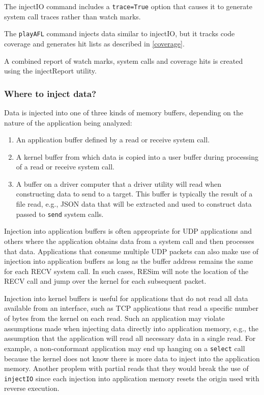\documentclass[titlepage]{article}
\begin{document}
The injectIO command includes a {\tt trace=True} option that causes it to generate system call traces rather than watch marks.

The {\tt playAFL} command injects data similar to injectIO, but it tracks code coverage and generates hit lists as described in \ref{coverage}.

A combined report of watch marks, system calls and coverage hits is created using the injectReport utility.

\subsubsection{Where to inject data?}
\label{where-to-inject}
Data is injected into one of three kinds of memory buffers, depending on the nature of the application being analyzed:
\begin{enumerate}
\item An application buffer defined by a read or receive system call.
\item A kernel buffer from which data is copied into a user buffer during processing of a read or receive system call.
\item A buffer on a driver computer that a driver utility will read when constructing data to send to a target.
This buffer is typically the result of a file read, e.g., JSON data that will be extracted and used to construct 
data passed to {\tt send} system calls.
\end{enumerate}

Injection into application buffers is often appropriate for UDP applications and others where the application obtains data from a system 
call and then processes that data.  Applications that consume multiple UDP packets can also make use of injection into application buffers
as long as the buffer address remains the same for each RECV system call.  In such cases, RESim will note the location of the RECV call
and jump over the kernel for each subsequent packet.
 
Injection into kernel buffers is useful for applications that do not read all data available from an interface, such as TCP applications that read a 
specific number of bytes from the kernel on each read.  
Such an application may violate assumptions made when injecting data directly into application memory, e.g., the assumption that the application
will read all necessary data in a single read.  For example, a non-conformant application may end up hanging on a {\tt select} call because
the kernel does not know there is more data to inject into the application memory.  Another proplem with partial reads that they would break
the use of {\tt injectIO} since each injection into application memory resets the origin used with reverse execution.
\end{document}

